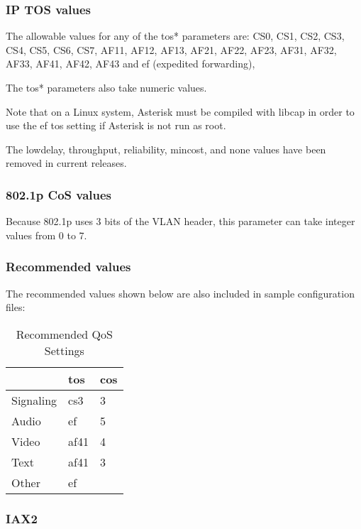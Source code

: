 \subsubsection{IP TOS values}
The allowable values for any of the tos* parameters are: 
CS0, CS1, CS2, CS3, CS4, CS5, CS6, CS7, AF11, AF12, AF13, AF21, AF22, AF23, 
AF31, AF32, AF33, AF41, AF42, AF43 and ef (expedited forwarding),

The tos* parameters also take numeric values.

Note that on a Linux system, Asterisk must be compiled with libcap in order to
use the ef tos setting if Asterisk is not run as root.

The lowdelay, throughput, reliability, mincost, and none values have been removed
in current releases.

\subsubsection{802.1p CoS values}

Because 802.1p uses 3 bits of the VLAN header, this parameter can take integer
values from 0 to 7.

\subsubsection{Recommended values}
The recommended values shown below are also included in sample configuration files:

\begin{table}[h!]
\begin{center}
\begin{tabular}{ | l || l | l | }
\hline
          & tos  & cos \\ \hline \hline
Signaling & cs3  & 3   \\ \hline
Audio     & ef   & 5   \\ \hline
Video     & af41 & 4   \\ \hline
Text      & af41 & 3   \\ \hline
Other     & ef   &     \\
\hline
\end{tabular}
\end{center}
\caption{Recommended QoS Settings}
\end{table}

\subsubsection{IAX2}

